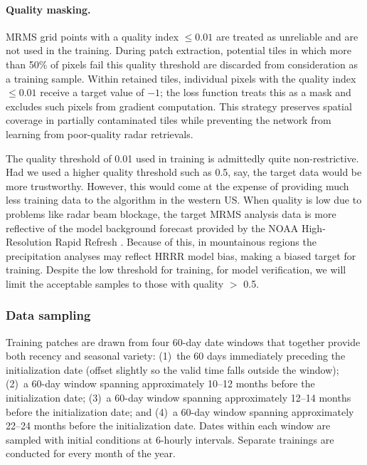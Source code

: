 \documentclass[11pt]{article}
\begin{document}
\paragraph{Quality masking.}
MRMS grid points with a quality index $\leq 0.01$ are treated as unreliable and are
not used in the training. During patch extraction, potential 
tiles in which more than 50\% of pixels fail this quality threshold
are discarded from consideration as a training sample.  Within retained tiles, 
individual pixels with the quality index $\leq 0.01$ 
receive a target value of $-1$; the loss function treats this as a
mask and excludes such pixels from gradient computation.  This
strategy preserves spatial coverage in partially contaminated tiles
while preventing the network from learning from poor-quality radar
retrievals.

The quality threshold of 0.01 used in training is admittedly quite non-restrictive.  
Had we used a higher quality threshold such as 0.5, say, the target data would
be more trustworthy.   However, this would come at the expense of providing
much less training data to the algorithm in the western US.  When
quality is low due to problems like radar beam blockage, the target MRMS analysis
data is more reflective of the model background forecast provided by the
NOAA High-Resolution Rapid Refresh \citep[HRRR;][]{benjamin2016, dowell2022}.
Because of this, in mountainous regions the precipitation analyses may reflect
HRRR model bias, making a biased target for training.   Despite the low threshold
for training, for model verification, we will limit the acceptable samples to those
with quality $>$ 0.5.

\subsubsection{Data sampling}
\label{sec:sampling}

Training patches are drawn from four 60-day date windows that
together provide both recency and seasonal variety:
(1)~the 60 days immediately preceding the initialization date
(offset slightly so the valid time falls outside the window);
(2)~a 60-day window spanning approximately 10--12 months before
the initialization date; (3)~a 60-day window spanning approximately
12--14 months before the initialization date; and (4)~a 60-day
window spanning approximately 22--24 months before the
initialization date.   Dates within each window are sampled with 
initial conditions at 6-hourly intervals.  Separate trainings are conducted
for every month of the year.
\end{document}
